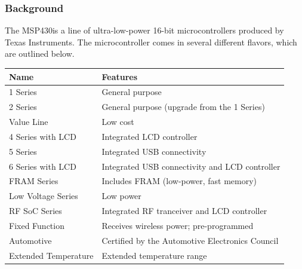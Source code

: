 \documentclass[12pt]{article}
\begin{document}
\subsubsection{Background}
The MSP430\texttrademark is a line of ultra-low-power 16-bit microcontrollers produced by Texas Instruments. The microcontroller comes in several different flavors, which are outlined below.
\begin{center}
  \begin{tabular}{ l | l }
    Name & Features \\
    \hline
    1 Series & General purpose \\
    2 Series & General purpose (upgrade from the 1 Series) \\
    Value Line & Low cost \\
    4 Series with LCD & Integrated LCD controller \\
    5 Series & Integrated USB connectivity \\
    6 Series with LCD & Integrated USB connectivity and LCD controller \\
    FRAM Series & Includes FRAM (low-power, fast memory) \\
    Low Voltage Series & Low power \\
    RF SoC Series & Integrated RF tranceiver and LCD controller \\
    Fixed Function & Receives wireless power; pre-programmed \\
    Automotive & Certified by the Automotive Electronics Council \\
    Extended Temperature & Extended temperature range
  \end{tabular}
\end{center}
\mbox{}\\
\end{document}
